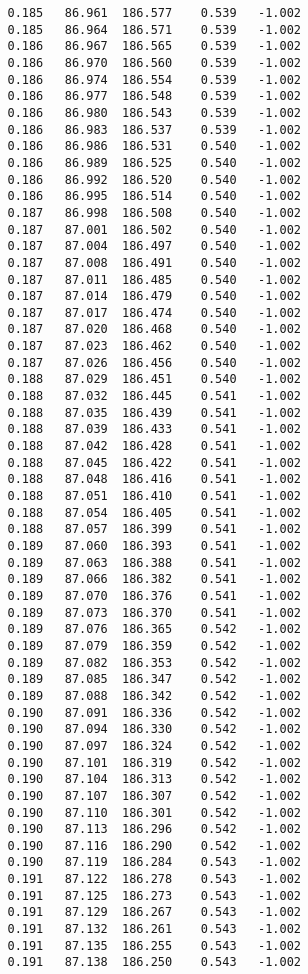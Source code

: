 \begin{verbatim}
   0.185   86.961  186.577    0.539   -1.002
   0.185   86.964  186.571    0.539   -1.002
   0.186   86.967  186.565    0.539   -1.002
   0.186   86.970  186.560    0.539   -1.002
   0.186   86.974  186.554    0.539   -1.002
   0.186   86.977  186.548    0.539   -1.002
   0.186   86.980  186.543    0.539   -1.002
   0.186   86.983  186.537    0.539   -1.002
   0.186   86.986  186.531    0.540   -1.002
   0.186   86.989  186.525    0.540   -1.002
   0.186   86.992  186.520    0.540   -1.002
   0.186   86.995  186.514    0.540   -1.002
   0.187   86.998  186.508    0.540   -1.002
   0.187   87.001  186.502    0.540   -1.002
   0.187   87.004  186.497    0.540   -1.002
   0.187   87.008  186.491    0.540   -1.002
   0.187   87.011  186.485    0.540   -1.002
   0.187   87.014  186.479    0.540   -1.002
   0.187   87.017  186.474    0.540   -1.002
   0.187   87.020  186.468    0.540   -1.002
   0.187   87.023  186.462    0.540   -1.002
   0.187   87.026  186.456    0.540   -1.002
   0.188   87.029  186.451    0.540   -1.002
   0.188   87.032  186.445    0.541   -1.002
   0.188   87.035  186.439    0.541   -1.002
   0.188   87.039  186.433    0.541   -1.002
   0.188   87.042  186.428    0.541   -1.002
   0.188   87.045  186.422    0.541   -1.002
   0.188   87.048  186.416    0.541   -1.002
   0.188   87.051  186.410    0.541   -1.002
   0.188   87.054  186.405    0.541   -1.002
   0.188   87.057  186.399    0.541   -1.002
   0.189   87.060  186.393    0.541   -1.002
   0.189   87.063  186.388    0.541   -1.002
   0.189   87.066  186.382    0.541   -1.002
   0.189   87.070  186.376    0.541   -1.002
   0.189   87.073  186.370    0.541   -1.002
   0.189   87.076  186.365    0.542   -1.002
   0.189   87.079  186.359    0.542   -1.002
   0.189   87.082  186.353    0.542   -1.002
   0.189   87.085  186.347    0.542   -1.002
   0.189   87.088  186.342    0.542   -1.002
   0.190   87.091  186.336    0.542   -1.002
   0.190   87.094  186.330    0.542   -1.002
   0.190   87.097  186.324    0.542   -1.002
   0.190   87.101  186.319    0.542   -1.002
   0.190   87.104  186.313    0.542   -1.002
   0.190   87.107  186.307    0.542   -1.002
   0.190   87.110  186.301    0.542   -1.002
   0.190   87.113  186.296    0.542   -1.002
   0.190   87.116  186.290    0.542   -1.002
   0.190   87.119  186.284    0.543   -1.002
   0.191   87.122  186.278    0.543   -1.002
   0.191   87.125  186.273    0.543   -1.002
   0.191   87.129  186.267    0.543   -1.002
   0.191   87.132  186.261    0.543   -1.002
   0.191   87.135  186.255    0.543   -1.002
   0.191   87.138  186.250    0.543   -1.002

\end{verbatim}
